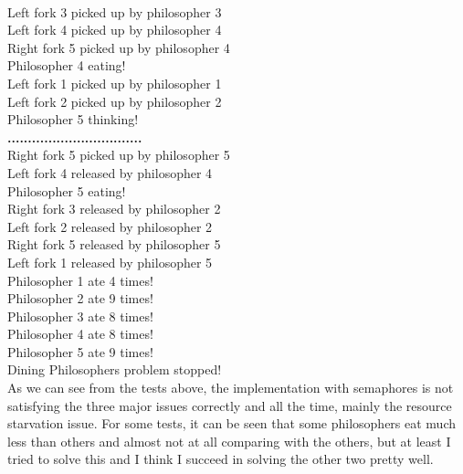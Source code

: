 \documentclass[14pt]{article}
\begin{document}
\\Left fork 3 picked up by philosopher 3
\\Left fork 4 picked up by philosopher 4
\\Right fork 5 picked up by philosopher 4
\\Philosopher 4 eating!
\\Left fork 1 picked up by philosopher 1
\\Left fork 2 picked up by philosopher 2
\\Philosopher 5 thinking!
\\\textbf{.................................}
\\Right fork 5 picked up by philosopher 5
\\Left fork 4 released by philosopher 4
\\Philosopher 5 eating!
\\Right fork 3 released by philosopher 2
\\Left fork 2 released by philosopher 2
\\Right fork 5 released by philosopher 5
\\Left fork 1 released by philosopher 5
\\Philosopher 1 ate 4 times!
\\Philosopher 2 ate 9 times!
\\Philosopher 3 ate 8 times!
\\Philosopher 4 ate 8 times!
\\Philosopher 5 ate 9 times!
\\Dining Philosophers problem stopped!
\vspace{2.5 mm}
\\As we can see from the tests above, the implementation with semaphores is not satisfying the three major issues correctly and all the time, mainly the resource starvation issue. For some tests, it can be seen that some philosophers eat much less than others and almost not at all comparing with the others, but at least I tried to solve this and I think I succeed in solving the other two pretty well.
\end{document}

